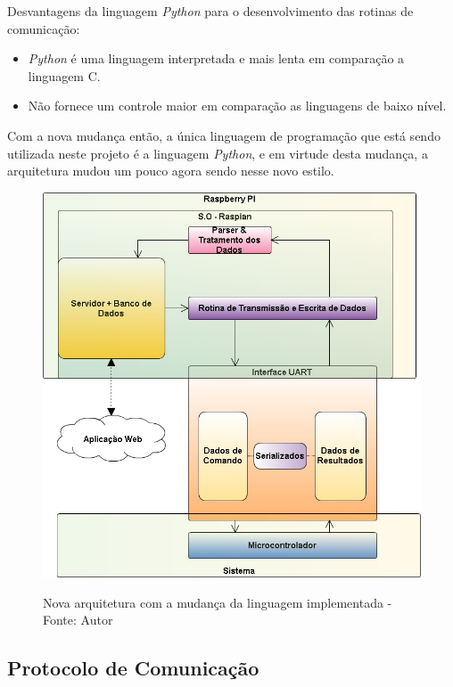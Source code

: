 Desvantagens da linguagem \textit{Python} para o desenvolvimento das rotinas de comunicação:

\begin{itemize}
    \item \textit{Python} é uma linguagem interpretada e mais lenta em comparação a linguagem C.
    \item Não fornece um controle maior em comparação as linguagens de baixo nível.
\end{itemize}

Com a nova mudança então, a única linguagem de programação que está sendo utilizada neste projeto é a linguagem \textit{Python}, e em virtude desta mudança, a arquitetura mudou um pouco agora sendo nesse novo estilo.

\begin{figure}[H]
\centering
\includegraphics[keepaspectratio=true,scale=0.7]{figuras/nova_arquitetura.png}
\label{fig:nova_arquitetura}
\caption{Nova arquitetura com a mudança da linguagem implementada - Fonte: Autor}
\end{figure}

\subsection*{\textbf{Protocolo de Comunicação}}


